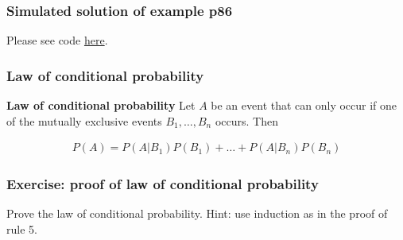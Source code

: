 \begin{frame}[fragile]
    \frametitle{Simulated solution of example p86}

    Please see code
    \href{https://joacorapela.github.io/gcnuBridging2023/auto_examples/foundations/plot_examplep86.html#sphx-glr-auto-examples-foundations-plot-examplep86-py}{here}.

\end{frame}

\begin{frame}
    \frametitle{Law of conditional probability}

    \begin{probRule}
        \textbf{Law of conditional probability} Let $A$ be an event that
            can only occur if one of the mutually exclusive events
            $B_1,\ldots,B_n$ occurs. Then

            \begin{align*}
                P(A) = P(A|B_1) P(B_1) + \ldots + P(A|B_n) P(B_n)  
            \end{align*}
    \end{probRule}

\end{frame}

\begin{frame}
    \frametitle{Exercise: proof of law of conditional probability}

    Prove the law of conditional probability. Hint: use induction as in the
    proof of rule 5.

\end{frame}

